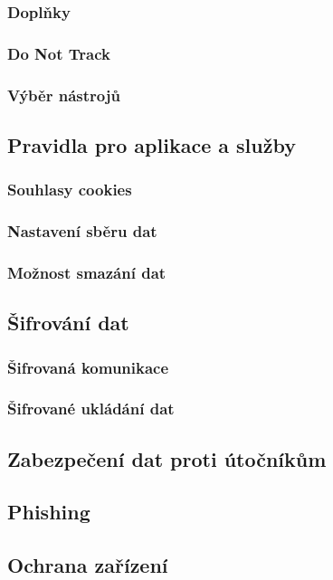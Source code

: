 \subsubsection{Doplňky}
\subsubsection{Do Not Track}
\subsubsection{Výběr nástrojů}

\subsection{Pravidla pro aplikace a služby}
\subsubsection{Souhlasy cookies}
\subsubsection{Nastavení sběru dat}
\subsubsection{Možnost smazání dat}

\subsection{Šifrování dat}
\subsubsection{Šifrovaná komunikace}
\subsubsection{Šifrované ukládání dat}

\subsection*{Zabezpečení dat proti útočníkům}
\subsection{Phishing}

\subsection{Ochrana zařízení}

